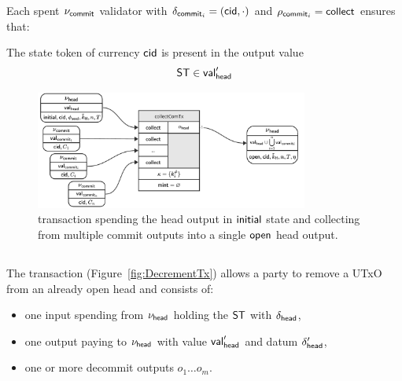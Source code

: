 \noindent Each spent $\nu_{\mathsf{commit}}$ validator with $\delta_{\mathsf{commit}_{i}} = (\mathsf{cid},\cdot)$ and $\rho_{\mathsf{commit}_{i}} = \mathsf{collect}$ ensures that:
\begin{menumerate}
	\item The state token of currency $\mathsf{cid}$ is present in the output value
	\[
		\mathsf{ST} \in \mathsf{val}_{\mathsf{head}}'
	\]
\end{menumerate}

\begin{figure}
	\centering
	\includegraphics[width=0.8\textwidth]{figures/collectComTx.pdf}
	\caption{\mtxCCom{} transaction spending the head output in $\mathsf{initial}$
		state and collecting from multiple commit outputs into a single
		$\mathsf{open}$ head output.}\label{fig:collectComTx}
\end{figure}

\subsection{}\label{sec:decrement-tx}

\noindent The \mtxDecrement{} transaction (Figure~\ref{fig:DecrementTx}) allows
a party to remove a UTxO from an already open head and consists of:

\begin{itemize}
	\item one input spending from $\nu_\mathsf{head}$ holding the $\mathsf{ST}$ with $\delta_{\mathsf{head}}$,
	\item one output paying to $\nu_\mathsf{head}$ with value $\mathsf{val}_{\mathsf{head}}'$ and
	      datum $\delta_{\mathsf{head}}'$,
	\item one or more decommit outputs $o_{1} \dots o_{m}$.
\end{itemize}

